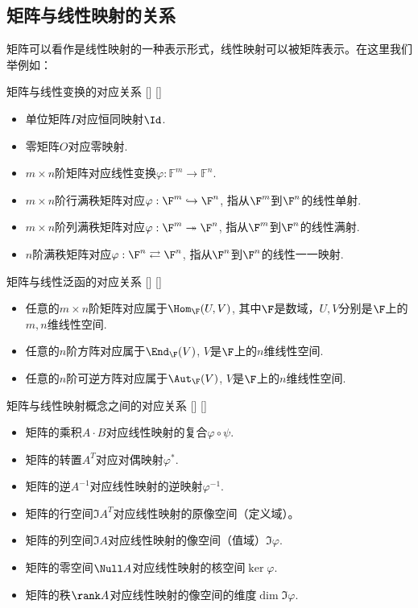 \documentclass[UTF8]{ctexart}
\begin{document}
	\subsection{矩阵与线性映射的关系}
		矩阵可以看作是线性映射的一种表示形式，线性映射可以被矩阵表示。在这里我们举例如：
		\begin{xmp}
			[]
			{矩阵与线性变换的对应关系}
			[]
			[]

			\begin{itemize}
				\item 单位矩阵$I$对应恒同映射$\Id$.
				\item 零矩阵$O$对应零映射.
				\item $m\times n$阶矩阵对应线性变换$\varphi : \mathbb F^m \to \mathbb F^n$.
				\item $m\times n$阶行满秩矩阵对应$\varphi:\F^m\hookrightarrow \F^n$, 指从$\F^m$到$\F^n$的线性单射.
				\item $m\times n$阶列满秩矩阵对应$\varphi:\F^m\twoheadrightarrow \F^n$, 指从$\F^m$到$\F^n$的线性满射.
				\item $n$阶满秩矩阵对应$\varphi:\F^n\rightleftarrows \F^n$, 指从$\F^n$到$\F^n$的线性一一映射.
			\end{itemize}
		\end{xmp}

		\begin{xmp}
			[]
			{矩阵与线性泛函的对应关系}
			[]
			[]

			\begin{itemize}
				\item 任意的$m\times n$阶矩阵对应属于$\Hom_{\F}(U,V)$, 其中$\F$是数域，$U,V$分别是$\F$上的$m,n$维线性空间.
				\item 任意的$n$阶方阵对应属于$\End_{\F}(V)$, $V$是$\F$上的$n$维线性空间.
				\item 任意的$n$阶可逆方阵对应属于$\Aut_{\F}(V)$, $V$是$\F$上的$n$维线性空间.
			\end{itemize}
		\end{xmp}

		\begin{xmp}
			[]
			{矩阵与线性映射概念之间的对应关系}
			[]
			[]

			\begin{itemize}
				\item 矩阵的乘积$A\cdot B$对应线性映射的复合$\varphi\circ\psi$.
				\item 矩阵的转置$A^T$对应对偶映射$\varphi^*$.
				\item 矩阵的逆$A^{-1}$对应线性映射的逆映射$\varphi^{-1}$.
				\item 矩阵的行空间$\Im A^T$对应线性映射的原像空间（定义域）。
				\item 矩阵的列空间$\Im A$对应线性映射的像空间（值域）$\Im\varphi$.
				\item 矩阵的零空间$\Null A$对应线性映射的核空间$\ker \varphi$.
				\item 矩阵的秩$\rank A$对应线性映射的像空间的维度$\dim\Im\varphi$.
			\end{itemize}
		\end{xmp}
\end{document}
